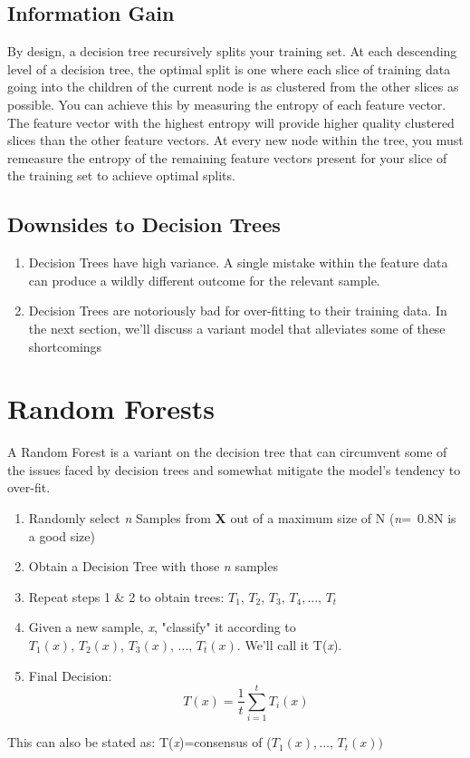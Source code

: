 \documentclass{article}
\theoremstyle{definition}
\begin{document}
\subsection{Information Gain}
By design, a decision tree recursively splits your training set. At each descending level of a decision tree, the optimal split is one where each slice of training data going into the children of the current node is as clustered from the other slices as possible. You can achieve this by measuring the entropy of each feature vector. The feature vector with the highest entropy will provide higher quality clustered slices than the other feature vectors. At every new node within the tree, you must remeasure the entropy of the remaining feature vectors present for your slice of the training set to achieve optimal splits.
\subsection{Downsides to Decision Trees}
\begin{enumerate}[-]

\item
Decision Trees have high variance. A single mistake within the feature data can produce a wildly \qquad different outcome for the relevant sample. \newline
\item
Decision Trees are notoriously bad for over-fitting to their training data. In the next section, we'll discuss a variant model that alleviates some of these shortcomings
\end{enumerate}

\section{Random Forests}
A Random Forest is a variant on the decision tree that can circumvent some of the issues faced by decision trees and somewhat mitigate the model's tendency to over-fit.
\begin{enumerate}[(1)]
\item
 Randomly select \textit{n} Samples from \textbf{X} out of a maximum size of N (\textit{n}=~0.8N is a good size)
\item
Obtain a Decision Tree with those \textit{n} samples
\item
Repeat steps 1 \& 2 to obtain trees:  $T_1,\,T_2,\,T_3,\,T_4,...,\, T_\textit{t}$
\item
Given a new sample, \textit{x}, "classify" it according to $T_1(\textit{x}),\,T_2(\textit{x}),\,T_3(\textit{x}),\,...,\,T_\textit{t}(\textit{x})$. We'll call it T(\textit{x}).
\item
Final Decision: $$T(\textit{x})=\frac{1}{\textit{t}}\sum_{i=1}^{\textit{t}} T_i(\textit{x})$$
\end{enumerate}
This can also be stated as: \qquad T(\textit{x})=consensus of ($T_1(\textit{x}),...,\,T_\textit{t}(\textit{x}))$
\end{document}

